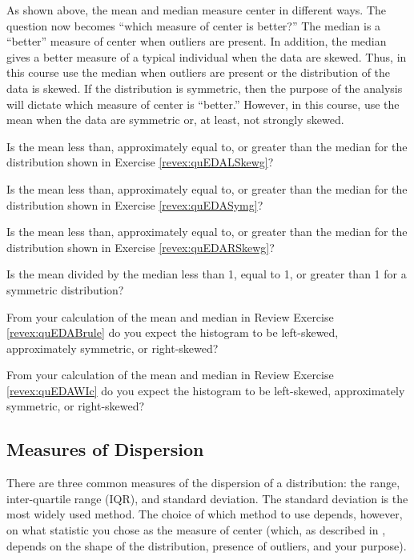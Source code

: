 \documentclass[10pt,openany]{book}\usepackage[]{graphicx}\usepackage[]{color}
\begin{document}
As shown above, the mean and median measure center in different ways.  The question now becomes ``which measure of center is better?''  The median is a ``better'' measure of center when outliers are present.  In addition, the median gives a better measure of a typical individual when the data are skewed.  Thus, in this course use the median when outliers are present or the distribution of the data is skewed.  If the distribution is symmetric, then the purpose of the analysis will dictate which measure of center is ``better.''  However, in this course, use the mean when the data are symmetric or, at least, not strongly skewed.


\vspace{-12pt}
\begin{exsection}
  \item \label{revex:quEDALSkewMM}Is the mean less than, approximately equal to, or greater than the median for the distribution shown in Exercise \ref{revex:quEDALSkewg}? 
  \item \label{revex:quEDAAsymMM}Is the mean less than, approximately equal to, or greater than the median for the distribution shown in Exercise \ref{revex:quEDASymg}? 
  \item \label{revex:quEDARSkewMM}Is the mean less than, approximately equal to, or greater than the median for the distribution shown in Exercise \ref{revex:quEDARSkewg}? 
  \item \label{revex:quEDARatio} Is the mean divided by the median less than 1, equal to 1, or greater than 1 for a symmetric distribution? 
  \item \label{revex:quEDABruleMM} From your calculation of the mean and median in Review Exercise  \ref{revex:quEDABrule} do you expect the histogram to be left-skewed, approximately symmetric, or right-skewed? 
  \item \label{revex:quEDAWIcMM} From your calculation of the mean and median in Review Exercise \ref{revex:quEDAWIc} do you expect the histogram to be left-skewed, approximately symmetric, or right-skewed? 
\end{exsection}


\subsection{Measures of Dispersion}
There are three common measures of the dispersion of a distribution: the range, inter-quartile range (IQR), and standard deviation.  The standard deviation is the most widely used method.  The choice of which method to use depends, however, on what statistic you chose as the measure of center (which, as described in , depends on the shape of the distribution, presence of outliers, and your purpose).
\end{document}

